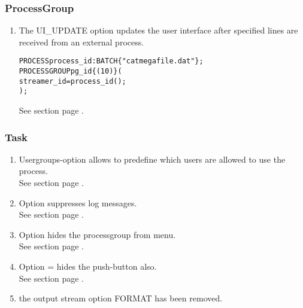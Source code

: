 \subsubsection{ProcessGroup}
\begin{enumerate}
\item The UI\_UPDATE option updates the user interface after specified lines
are received from an external process. \\

\begin{boxedminipage}[t]{\linewidth}
\begin{alltt}
  PROCESS process_id: BATCH \{"cat megafile.dat"\};
  PROCESSGROUP pg_id \{\UIUPDATE(10)\} (
    streamer_id = process_id();
  );
\end{alltt}
\end{boxedminipage}

See section  page \pageref{sntxdiagram:processgroupoptions}. \\
\end{enumerate}
\subsubsection{Task}
\begin{enumerate}
\item Usergroups-option allows to predefine which users 
are allowed to use the process. \\
See section  page \pageref{sec:optasks}. \\
\item Option \NOLOG{} suppresses log messages.\\
See section  page \pageref{sec:optasks}. \\
\item Option \HIDDEN{}  hides the processgroup from menu. \\
See section  page \pageref{sec:optasks}. \\
\item Option \FORM=\NONE{} hides the push-button also. \\
See section  page \pageref{sec:optasks}. \\
\item the output stream option FORMAT has been removed. \\
\end{enumerate}
